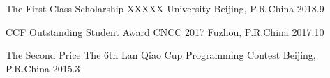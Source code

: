 


\begin{cvhonors}

\cvhonor
{The First Class Scholarship} %
{XXXXX University} %
{Beijing, P.R.China} %
{2018.9} %


\cvhonor
{CCF Outstanding Student Award} %
{CNCC 2017} %
{Fuzhou, P.R.China} %
{2017.10} %


\cvhonor
{The Second Price} %
{The 6th Lan Qiao Cup Programming Contest} %
{Beijing, P.R.China} %
{2015.3} %

\end{cvhonors}
